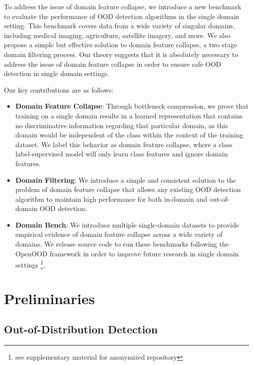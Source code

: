 \documentclass[letterpaper]{article} %
\theoremstyle{plain}
\theoremstyle{definition}
\theoremstyle{remark}
\begin{document}
To address the issue of domain feature collapse, we introduce a new benchmark to evaluate the performance of OOD detection algorithms in the single domain setting. This benchmark covers data from a wide variety of singular domains, including medical imaging, agriculture, satellite imagery, and more. We also propose a simple but effective solution to domain feature collapse, a two stage domain filtering process. Our theory suggests that it is absolutely necessary to address the issue of domain feature collapse in order to ensure safe OOD detection in single domain settings. 

Our key contributions are as follows:
\begin{itemize}
\item \textbf{Domain Feature Collapse}: Through bottleneck compression, we prove that training on a single domain results in a learned representation that contains no discriminative information regarding that particular domain, as this domain would be independent of the class within the context of the training dataset. We label this behavior as domain feature collapse, where a class label-supervised model will only learn class features and ignore domain features. 

\item \textbf{Domain Filtering}: We introduce a simple and consistent solution to the problem of domain feature collapse that allows any existing OOD detection algorithm to maintain high performance for both in-domain and out-of-domain OOD detection.  

\item \textbf{Domain Bench}: We introduce multiple single-domain datasets to provide empirical evidence of domain feature collapse across a wide variety of domains. We release source code to run these benchmarks following the OpenOOD framework \citep{zhang2023openood} in order to improve future research in single domain settings \footnote{see supplementary material for anonymized repository}.



\end{itemize}


\section{Preliminaries}
\label{sec:preliminaries}

\subsection{Out-of-Distribution Detection}
\label{sec:ood_detection}
\end{document}
